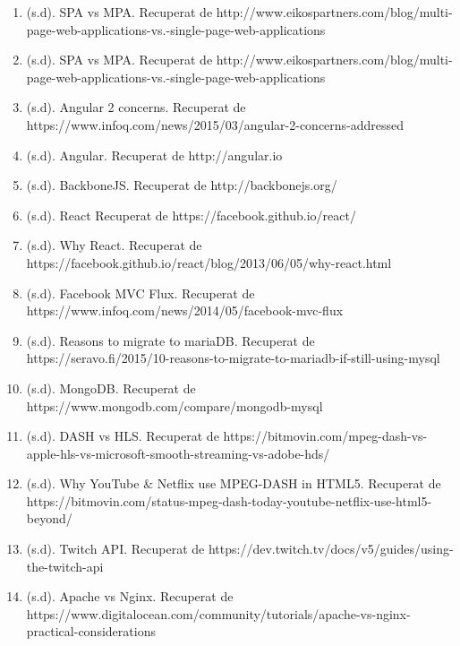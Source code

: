 \documentclass[12pt, titlepage]{article}
\begin{document}
\begin{enumerate}
\item (s.d). SPA vs MPA. Recuperat de http://www.eikospartners.com/blog/multi-page-web-applications-vs.-single-page-web-applications

\item (s.d). SPA vs MPA. Recuperat de http://www.eikospartners.com/blog/multi-page-web-applications-vs.-single-page-web-applications

\item (s.d). Angular 2 concerns. Recuperat de \\ https://www.infoq.com/news/2015/03/angular-2-concerns-addressed

\item (s.d). Angular. Recuperat de http://angular.io

\item (s.d). BackboneJS. Recuperat de http://backbonejs.org/

\item (s.d). React Recuperat de https://facebook.github.io/react/

\item (s.d). Why React. Recuperat de \\ https://facebook.github.io/react/blog/2013/06/05/why-react.html

\item (s.d). Facebook MVC Flux. Recuperat de \\ https://www.infoq.com/news/2014/05/facebook-mvc-flux

\item (s.d). Reasons to migrate to mariaDB. Recuperat de https://seravo.fi/2015/10-reasons-to-migrate-to-mariadb-if-still-using-mysql

\item (s.d). MongoDB. Recuperat de https://www.mongodb.com/compare/mongodb-mysql

\item (s.d). DASH vs HLS. Recuperat de https://bitmovin.com/mpeg-dash-vs-apple-hls-vs-microsoft-smooth-streaming-vs-adobe-hds/

\item (s.d). Why YouTube \& Netflix use MPEG-DASH in HTML5. Recuperat de https://bitmovin.com/status-mpeg-dash-today-youtube-netflix-use-html5-beyond/

\item (s.d). Twitch API. Recuperat de https://dev.twitch.tv/docs/v5/guides/using-the-twitch-api

\item (s.d). Apache vs Nginx. Recuperat de \\ https://www.digitalocean.com/community/tutorials/apache-vs-nginx-practical-considerations


\end{enumerate}
\end{document}
